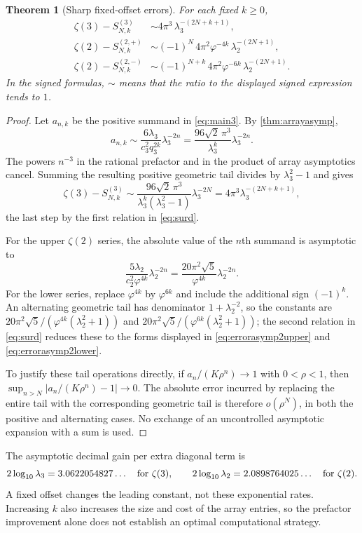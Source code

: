 \documentclass[11pt,letterpaper]{article}
\numberwithin{equation}{section}
\newtheorem{theorem}{Theorem}[section]
\theoremstyle{definition}
\newcommand{\zthree}{\zeta(3)}
\newcommand{\ztwo}{\zeta(2)}
\begin{document}
\begin{theorem}[Sharp fixed-offset errors]\label{thm:errorasymp}
For each fixed $k\geq0$,
\begin{align}
 \zthree-S^{(3)}_{N,k}
 &\sim4\pi^3\,\lambda_3^{-(2N+k+1)},\label{eq:errorasymp3}\\
 \ztwo-S^{(2,+)}_{N,k}
 &\sim(-1)^N\,4\pi^2\varphi^{-4k}\,
       \lambda_2^{-(2N+1)},\label{eq:errorasymp2upper}\\
 \ztwo-S^{(2,-)}_{N,k}
 &\sim(-1)^{N+k}\,4\pi^2\varphi^{-6k}\,
       \lambda_2^{-(2N+1)}.\label{eq:errorasymp2lower}
\end{align}
In the signed formulas, $\sim$ means that the ratio to the displayed
signed expression tends to $1$.
\end{theorem}
\begin{proof}
Let $a_{n,k}$ be the positive summand in \eqref{eq:main3}.
By \cref{thm:arrayasymp},
\[
 a_{n,k}\sim \frac{6\lambda_3}{c_3^2q_3^{2k}}\lambda_3^{-2n}
 =\frac{96\sqrt2\,\pi^3}{\lambda_3^k}\lambda_3^{-2n}.
\]
The powers $n^{-3}$ in the rational prefactor and in the product of
array asymptotics cancel. Summing the resulting positive geometric tail
divides by $\lambda_3^2-1$ and gives
\[
 \zthree-S^{(3)}_{N,k}
 \sim\frac{96\sqrt2\,\pi^3}{\lambda_3^k(\lambda_3^2-1)}\lambda_3^{-2N}
 =4\pi^3\lambda_3^{-(2N+k+1)},
\]
the last step by the first relation in \eqref{eq:surd}.

For the upper $\zeta(2)$ series, the absolute value of the $n$th
summand is asymptotic to
\[
 \frac{5\lambda_2}{c_2^2\varphi^{4k}}\lambda_2^{-2n}
 =\frac{20\pi^2\sqrt5}{\varphi^{4k}}\lambda_2^{-2n}.
\]
For the lower series, replace $\varphi^{4k}$ by $\varphi^{6k}$ and
include the additional sign $(-1)^k$. An alternating geometric tail
has denominator $1+\lambda_2^{-2}$, so the constants are
$20\pi^2\sqrt5/(\varphi^{4k}(\lambda_2^2+1))$ and
$20\pi^2\sqrt5/(\varphi^{6k}(\lambda_2^2+1))$; the second relation in
\eqref{eq:surd} reduces these to the forms displayed in
\eqref{eq:errorasymp2upper} and \eqref{eq:errorasymp2lower}.

To justify these tail operations directly, if $a_n/(K\rho^n)\to1$
with $0<\rho<1$, then
$\sup_{n>N}|a_n/(K\rho^n)-1|\to0$. The absolute error incurred by
replacing the entire tail with the corresponding geometric tail is
therefore $o(\rho^N)$, in both the positive and alternating cases.
No exchange of an uncontrolled asymptotic expansion with a sum is used.
\end{proof}

The asymptotic decimal gain per extra diagonal term is
\[
 2\log_{10}\lambda_3=3.0622054827\ldots
 \quad\hbox{for }\zthree,
 \qquad
 2\log_{10}\lambda_2=2.0898764025\ldots
 \quad\hbox{for }\ztwo.
\]
A fixed offset changes the leading constant, not these exponential
rates. Increasing $k$ also increases the size and cost of the array
entries, so the prefactor improvement alone does not establish an
optimal computational strategy.
\end{document}
